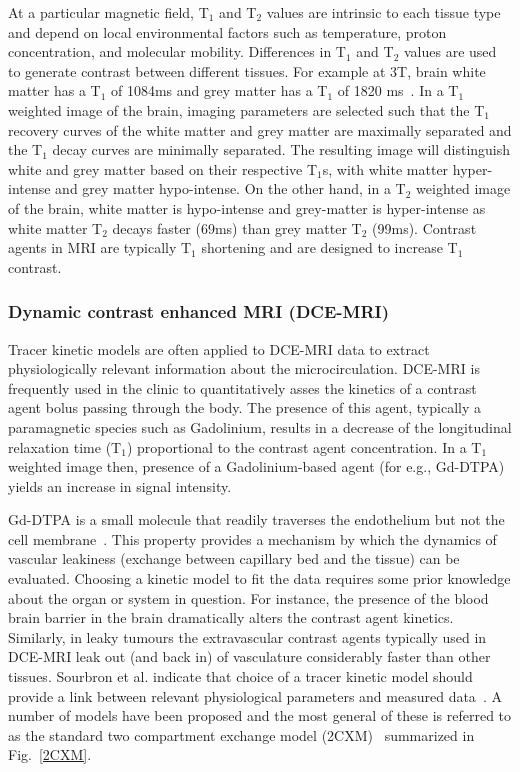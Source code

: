 At a particular magnetic field, T$_1$ and T$_2$ values are intrinsic to each tissue type and depend on local environmental factors such as temperature, proton concentration, and molecular mobility. 
Differences in T$_1$ and T$_2$ values are used to generate contrast between different tissues. 
For example at 3T, brain white matter has a T$_1$ of 1084ms and grey matter has a T$_1$ of 1820 ms~\cite{Stanisz:2005fe}. 
In a T$_1$ weighted image of the brain, imaging parameters are selected such that the T$_1$ recovery curves of the white matter and grey matter are maximally separated and the T$_1$ decay curves are minimally separated. 
The resulting image will distinguish white and grey matter based on their respective T$_1$s, with white matter hyper-intense and grey matter hypo-intense. 
On the other hand, in a T$_2$ weighted image of the brain, white matter is hypo-intense and grey-matter is hyper-intense as white matter T$_2$ decays faster (69ms) than grey matter T$_2$ (99ms). 
Contrast agents in MRI are typically T$_1$ shortening and are designed to increase T$_1$ contrast.

\subsubsection{Dynamic contrast enhanced MRI (\acs{DCE-MRI})}

Tracer kinetic models are often applied to \acs{DCE-MRI} data to extract physiologically relevant information about the microcirculation. 
\acs{DCE-MRI} is frequently used in the clinic to quantitatively asses the kinetics of a contrast agent bolus passing through the body. 
The presence of this agent, typically a paramagnetic species such as Gadolinium, results in a decrease of the longitudinal relaxation time (T$_1$) proportional to the contrast agent concentration. 
In a T$_1$ weighted image then, presence of a Gadolinium-based agent (for e.g., Gd-DTPA) yields an increase in signal intensity. 

Gd-DTPA is a small molecule that readily traverses the endothelium but not the cell membrane~\cite{WalkerSamuel:2006ch}. 
This property provides a mechanism by which the dynamics of vascular leakiness (exchange between capillary bed and the tissue) can be evaluated. 
Choosing a kinetic model to fit the data requires some prior knowledge about the organ or system in question. 
For instance, the presence of the blood brain barrier in the brain dramatically alters the contrast agent kinetics. 
Similarly, in leaky tumours the extravascular contrast agents typically used in \acs{DCE-MRI} leak out (and back in) of vasculature considerably faster than other tissues. 
Sourbron et al. indicate that choice of a tracer kinetic model should provide a link between relevant physiological parameters and measured data~\cite{Sourbron:2011ce}. 
A number of models have been proposed and the most general of these is referred to as the standard two compartment exchange model (2CXM)~\cite{Tofts:1999we} summarized in Fig.~\ref{2CXM}.

